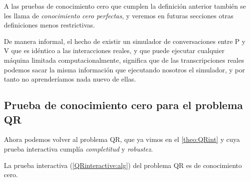 A las pruebas de conocimiento cero que cumplen la definición anterior también se les llama de \textit{conocimiento cero perfectas}, y veremos en futuras secciones otras definiciones menos restrictivas.



De manera informal, el hecho de existir un simulador de conversaciones entre P y V que es idéntico a las interacciones reales, y que puede ejecutar cualquier máquina limitada computacionalmente, significa que de las transcripciones reales podemos sacar la misma información que ejecutando nosotros el simulador, y por tanto no aprenderíamos nada nuevo de ellas.



\subsection{Prueba de conocimiento cero para el problema QR}

Ahora podemos volver al problema QR, que ya vimos en el \autoref{theo:QRint} y cuya prueba interactiva cumplía \textit{completitud} y \textit{robustez}.

\begin{theorem}
	La prueba interactiva (\ref{QRinteractive:alg}) del problema QR es de conocimiento cero.
\end{theorem}

